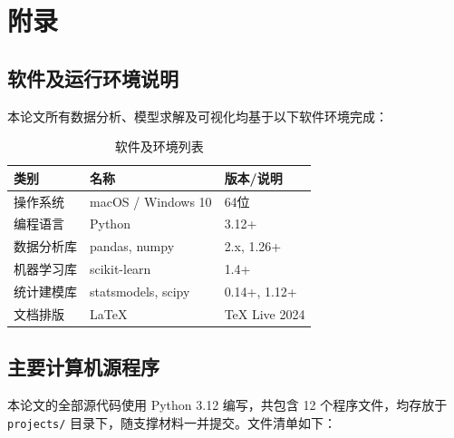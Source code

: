 \documentclass[a4paper,12pt]{ctexart}
\begin{document}

\newpage
\appendix
\section{附录}

\subsection{软件及运行环境说明}

本论文所有数据分析、模型求解及可视化均基于以下软件环境完成：

\begin{table}[H]
\centering
\caption{软件及环境列表}
\begin{tabular}{lll}
\toprule
\textbf{类别} & \textbf{名称} & \textbf{版本/说明} \\
\midrule
操作系统 & macOS / Windows 10 & 64位 \\
编程语言 & Python & 3.12+ \\
数据分析库 & pandas, numpy & 2.x, 1.26+ \\
机器学习库 & scikit-learn & 1.4+ \\
统计建模库 & statsmodels, scipy & 0.14+, 1.12+ \\
文档排版 & \LaTeX & TeX Live 2024 \\
\bottomrule
\end{tabular}
\end{table}

\subsection{主要计算机源程序}

本论文的全部源代码使用 Python 3.12 编写，共包含 12 个程序文件，均存放于 \texttt{projects/} 目录下，随支撑材料一并提交。文件清单如下：
\end{document}
